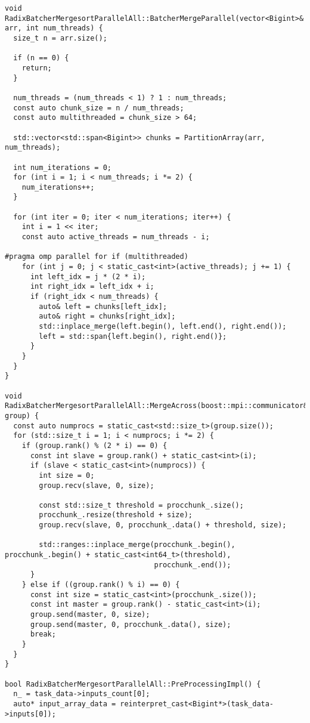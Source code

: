 \documentclass[a4paper,12pt]{article}
\begin{document}
\begin{lstlisting}
void RadixBatcherMergesortParallelAll::BatcherMergeParallel(vector<Bigint>& arr, int num_threads) {
  size_t n = arr.size();

  if (n == 0) {
    return;
  }

  num_threads = (num_threads < 1) ? 1 : num_threads;
  const auto chunk_size = n / num_threads;
  const auto multithreaded = chunk_size > 64;

  std::vector<std::span<Bigint>> chunks = PartitionArray(arr, num_threads);

  int num_iterations = 0;
  for (int i = 1; i < num_threads; i *= 2) {
    num_iterations++;
  }

  for (int iter = 0; iter < num_iterations; iter++) {
    int i = 1 << iter;
    const auto active_threads = num_threads - i;

#pragma omp parallel for if (multithreaded)
    for (int j = 0; j < static_cast<int>(active_threads); j += 1) {
      int left_idx = j * (2 * i);
      int right_idx = left_idx + i;
      if (right_idx < num_threads) {
        auto& left = chunks[left_idx];
        auto& right = chunks[right_idx];
        std::inplace_merge(left.begin(), left.end(), right.end());
        left = std::span{left.begin(), right.end()};
      }
    }
  }
}

void RadixBatcherMergesortParallelAll::MergeAcross(boost::mpi::communicator& group) {
  const auto numprocs = static_cast<std::size_t>(group.size());
  for (std::size_t i = 1; i < numprocs; i *= 2) {
    if (group.rank() % (2 * i) == 0) {
      const int slave = group.rank() + static_cast<int>(i);
      if (slave < static_cast<int>(numprocs)) {
        int size = 0;
        group.recv(slave, 0, size);

        const std::size_t threshold = procchunk_.size();
        procchunk_.resize(threshold + size);
        group.recv(slave, 0, procchunk_.data() + threshold, size);

        std::ranges::inplace_merge(procchunk_.begin(), procchunk_.begin() + static_cast<int64_t>(threshold),
                                   procchunk_.end());
      }
    } else if ((group.rank() % i) == 0) {
      const int size = static_cast<int>(procchunk_.size());
      const int master = group.rank() - static_cast<int>(i);
      group.send(master, 0, size);
      group.send(master, 0, procchunk_.data(), size);
      break;
    }
  }
}

bool RadixBatcherMergesortParallelAll::PreProcessingImpl() {
  n_ = task_data->inputs_count[0];
  auto* input_array_data = reinterpret_cast<Bigint*>(task_data->inputs[0]);


\end{lstlisting}
\end{document}
